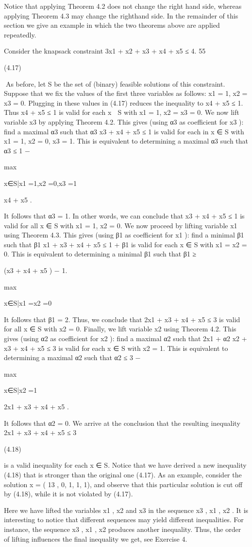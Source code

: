 Notice that applying Theorem 4.2 does not change the right hand side, whereas applying Theorem 4.3 may change the righthand side. In the remainder of this section we give an example in which the two theorems above are applied repeatedly.

\begin{example}
Consider the knapsack constraint
3x1 + x2 + x3 + x4 + x5 ≤ 4.
55

(4.17)

As before, let S be the set of (binary) feasible solutions of this constraint. Suppose that we fix the values
of the first three variables as follows:
x1 = 1, x2 = x3 = 0.
Plugging in these values in (4.17) reduces the inequality to x4 + x5 ≤ 1. Thus x4 + x5 ≤ 1 is valid for
each x ∈ S with x1 = 1, x2 = x3 = 0.
We now lift variable x3 by applying Theorem 4.2. This gives (using α3 as coefficient for x3 ): find a
maximal α3 such that α3 x3 + x4 + x5 ≤ 1 is valid for each in x ∈ S with x1 = 1, x2 = 0, x3 = 1. This is
equivalent to determining a maximal α3 such that
α3 ≤ 1 −

max

x∈S|x1 =1,x2 =0,x3 =1

x4 + x5 .

It follows that α3 = 1. In other words, we can conclude that x3 + x4 + x5 ≤ 1 is valid for all x ∈ S with
x1 = 1, x2 = 0.
We now proceed by lifting variable x1 using Theorem 4.3. This gives (using β1 as coefficient for x1 ): find
a minimal β1 such that β1 x1 + x3 + x4 + x5 ≤ 1 + β1 is valid for each x ∈ S with x1 = x2 = 0. This is
equivalent to determining a minimal β1 such that
β1 ≥

(x3 + x4 + x5 ) − 1.

max

x∈S|x1 =x2 =0

It follows that β1 = 2. Thus, we conclude that 2x1 + x3 + x4 + x5 ≤ 3 is valid for all x ∈ S with x2 = 0.
Finally, we lift variable x2 using Theorem 4.2. This gives (using α2 as coefficient for x2 ): find a maximal
α2 such that 2x1 + α2 x2 + x3 + x4 + x5 ≤ 3 is valid for each x ∈ S with x2 = 1. This is equivalent to
determining a maximal α2 such that
α2 ≤ 3 −

max

x∈S|x2 =1

2x1 + x3 + x4 + x5 .

It follows that α2 = 0. We arrive at the conclusion that the resulting inequality
2x1 + x3 + x4 + x5 ≤ 3

(4.18)

is a valid inequality for each x ∈ S. Notice that we have derived a new inequality (4.18) that is stronger
than the original one (4.17). As an example, consider the solution x = ( 13 , 0, 1, 1, 1), and observe that
this particular solution is cut off by (4.18), while it is not violated by (4.17).

Here we have lifted the variables x1 , x2 and x3 in the sequence x3 , x1 , x2 . It is interesting to notice that
different sequences may yield different inequalities. For instance, the sequence x3 , x1 , x2 produces another
inequality. Thus, the order of lifting influences the final inequality we get, see Exercise 4.
\end{example}


